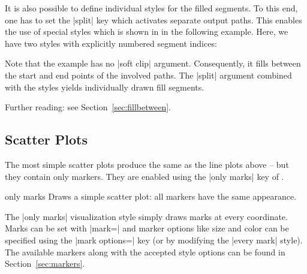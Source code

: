{{It is also possible to define individual styles for the filled segments. To
this end, one has to set the |split| key which activates separate output paths.
This enables the use of special styles which is shown in in the following
example. Here, we have two styles with explicitly numbered segment indices:
%
\begin{codeexample}[]
\end{codeexample}
%
\noindent Note that the example has no |soft clip| argument. Consequently, it
fills between the start and end points of the involved paths. The |split|
argument combined with the styles yields individually drawn fill segments.

Further reading: see Section~\ref{sec:fillbetween}.
}




\subsection{Scatter Plots}
\label{sec:pgfplots:scatter:2d}

The most simple scatter plots produce the same as the line plots above -- but
they contain only markers. They are enabled using the |only marks| key of
\Tikz{}.

\begin{plottype}{only marks}
    Draws a simple scatter plot: all markers have the same appearance.
\begin{codeexample}[]
\end{codeexample}
    The |only marks| visualization style simply draws marks at every
    coordinate. Marks can be set with |mark=| and marker
    options like size and color can be specified using the
    |mark options=| key (or by modifying the |every mark|
    style). The available markers along with the accepted style options can be
    found in Section~\ref{sec:markers}.
\end{plottype}

}
